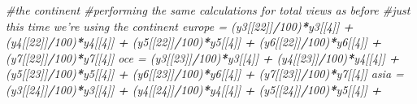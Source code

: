\documentclass[
]{article}
\newenvironment{Shaded}{\begin{snugshade}}{\end{snugshade}}
\newcommand{\CommentTok}[1]{\textcolor[rgb]{0.56,0.35,0.01}{\textit{#1}}}
\newcommand{\DecValTok}[1]{\textcolor[rgb]{0.00,0.00,0.81}{#1}}
\newcommand{\NormalTok}[1]{#1}
\newcommand{\OperatorTok}[1]{\textcolor[rgb]{0.81,0.36,0.00}{\textbf{#1}}}
\newcommand{\StringTok}[1]{\textcolor[rgb]{0.31,0.60,0.02}{#1}}
\begin{document}
\begin{Shaded}
\begin{Highlighting}[]
\CommentTok{#the continent %s are in columns 22 to 27}
\CommentTok{#performing the same calculations for total views as before}
\CommentTok{#just this time we're using the continent %s rather than viewed %s}
\NormalTok{europe =}\StringTok{ }\NormalTok{(y3[[}\DecValTok{22}\NormalTok{]]}\OperatorTok{/}\DecValTok{100}\NormalTok{)}\OperatorTok{*}\NormalTok{y3[[}\DecValTok{4}\NormalTok{]] }\OperatorTok{+}\StringTok{ }\NormalTok{(y4[[}\DecValTok{22}\NormalTok{]]}\OperatorTok{/}\DecValTok{100}\NormalTok{)}\OperatorTok{*}\NormalTok{y4[[}\DecValTok{4}\NormalTok{]] }\OperatorTok{+}\StringTok{ }\NormalTok{(y5[[}\DecValTok{22}\NormalTok{]]}\OperatorTok{/}\DecValTok{100}\NormalTok{)}\OperatorTok{*}\NormalTok{y5[[}\DecValTok{4}\NormalTok{]] }\OperatorTok{+}\StringTok{ }
\StringTok{  }\NormalTok{(y6[[}\DecValTok{22}\NormalTok{]]}\OperatorTok{/}\DecValTok{100}\NormalTok{)}\OperatorTok{*}\NormalTok{y6[[}\DecValTok{4}\NormalTok{]] }\OperatorTok{+}\StringTok{ }\NormalTok{(y7[[}\DecValTok{22}\NormalTok{]]}\OperatorTok{/}\DecValTok{100}\NormalTok{)}\OperatorTok{*}\NormalTok{y7[[}\DecValTok{4}\NormalTok{]]}
\NormalTok{oce =}\StringTok{ }\NormalTok{(y3[[}\DecValTok{23}\NormalTok{]]}\OperatorTok{/}\DecValTok{100}\NormalTok{)}\OperatorTok{*}\NormalTok{y3[[}\DecValTok{4}\NormalTok{]] }\OperatorTok{+}\StringTok{ }\NormalTok{(y4[[}\DecValTok{23}\NormalTok{]]}\OperatorTok{/}\DecValTok{100}\NormalTok{)}\OperatorTok{*}\NormalTok{y4[[}\DecValTok{4}\NormalTok{]] }\OperatorTok{+}\StringTok{ }\NormalTok{(y5[[}\DecValTok{23}\NormalTok{]]}\OperatorTok{/}\DecValTok{100}\NormalTok{)}\OperatorTok{*}\NormalTok{y5[[}\DecValTok{4}\NormalTok{]] }\OperatorTok{+}\StringTok{ }
\StringTok{  }\NormalTok{(y6[[}\DecValTok{23}\NormalTok{]]}\OperatorTok{/}\DecValTok{100}\NormalTok{)}\OperatorTok{*}\NormalTok{y6[[}\DecValTok{4}\NormalTok{]] }\OperatorTok{+}\StringTok{ }\NormalTok{(y7[[}\DecValTok{23}\NormalTok{]]}\OperatorTok{/}\DecValTok{100}\NormalTok{)}\OperatorTok{*}\NormalTok{y7[[}\DecValTok{4}\NormalTok{]]}
\NormalTok{asia =}\StringTok{ }\NormalTok{(y3[[}\DecValTok{24}\NormalTok{]]}\OperatorTok{/}\DecValTok{100}\NormalTok{)}\OperatorTok{*}\NormalTok{y3[[}\DecValTok{4}\NormalTok{]] }\OperatorTok{+}\StringTok{ }\NormalTok{(y4[[}\DecValTok{24}\NormalTok{]]}\OperatorTok{/}\DecValTok{100}\NormalTok{)}\OperatorTok{*}\NormalTok{y4[[}\DecValTok{4}\NormalTok{]] }\OperatorTok{+}\StringTok{ }\NormalTok{(y5[[}\DecValTok{24}\NormalTok{]]}\OperatorTok{/}\DecValTok{100}\NormalTok{)}\OperatorTok{*}\NormalTok{y5[[}\DecValTok{4}\NormalTok{]] }\OperatorTok{+}\StringTok{ }
}}
\end{Highlighting}
\end{Shaded}
\end{document}
